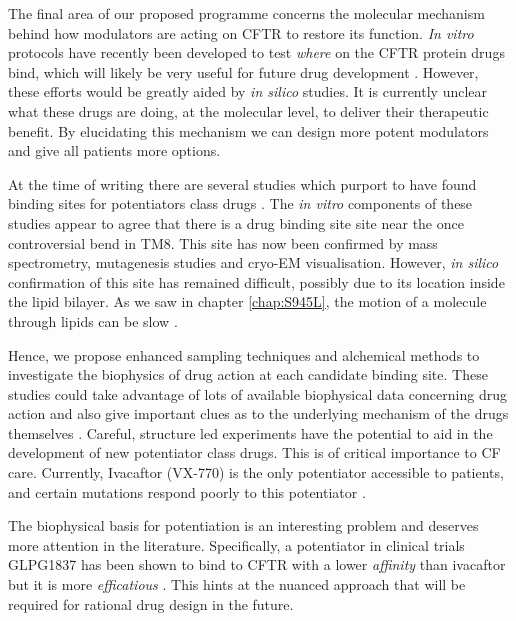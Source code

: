 The final area of our proposed programme concerns the molecular mechanism behind how modulators are acting on CFTR to restore its function. \textit{In vitro} protocols have recently been developed to test \textit{where} on the CFTR protein drugs bind, which will likely be very useful for future drug development \cite{laselva2022}. However, these efforts would be greatly aided by \textit{in silico} studies. It is currently unclear what these drugs are doing, at the molecular level, to deliver their therapeutic benefit. By elucidating this mechanism we can design more potent modulators and give all patients more options. 

At the time of writing there are several studies which purport to have found binding sites for potentiators class drugs \cite{yeh2019, laselva2021a, liu2019, baatallah2021}. The \textit {in vitro} components of these studies appear to agree that there is a drug binding site site near the once controversial bend in TM8. This site has now been confirmed by mass spectrometry, mutagenesis studies and cryo-EM visualisation. However, \textit{in silico} confirmation of this site has remained difficult, possibly due to its location inside the lipid bilayer. As we saw in chapter \ref{chap:S945L}, the motion of a molecule through lipids can be slow \cite{laselva2021a}. 

Hence, we propose enhanced sampling techniques and alchemical methods to investigate the biophysics of drug action at each candidate binding site. These studies could take advantage of lots of available biophysical data concerning drug action and also give important clues as to the underlying mechanism of the drugs themselves \cite{yeh2017, yeh2019,csanady2019}. Careful, structure led experiments have the potential to aid in the development of new potentiator class drugs. This is of critical importance to CF care. Currently, Ivacaftor (VX-770) is the only potentiator accessible to patients, and certain mutations respond poorly to this potentiator \cite{phuan2018, vangoor2014}. 

The biophysical basis for potentiation is an interesting problem and deserves more attention in the literature. Specifically, a potentiator in clinical trials GLPG1837 has been shown to bind to CFTR with a lower \textit{affinity} than ivacaftor but it is more \textit{efficatious} \cite{yeh2019, yeh2017,vanderplas2018}. This hints at the nuanced approach that will be required for rational drug design in the future. 

